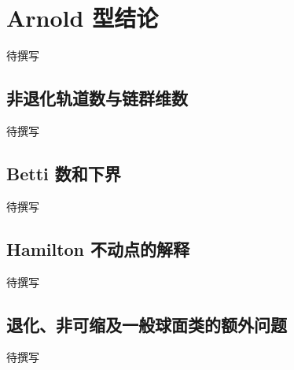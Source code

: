 
% 
% 

\section{Arnold 型结论}
\label{g4:sec:2704}

待撰写

\subsection{非退化轨道数与链群维数}
\label{g4:subsec:2704:01}
待撰写

\subsection{Betti 数和下界}
\label{g4:subsec:2704:02}
待撰写

\subsection{Hamilton 不动点的解释}
\label{g4:subsec:2704:03}
待撰写

\subsection{退化、非可缩及一般球面类的额外问题}
\label{g4:subsec:2704:04}
待撰写

